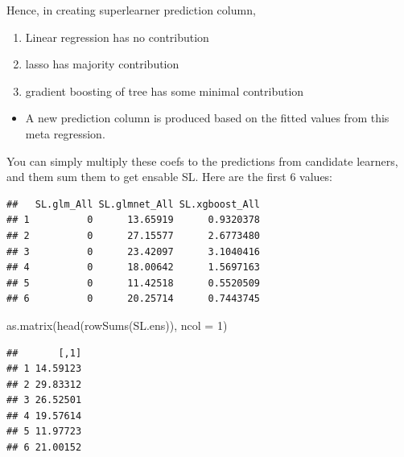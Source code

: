 \documentclass[
]{book}
\newenvironment{Shaded}{\begin{snugshade}}{\end{snugshade}}
\newcommand{\AttributeTok}[1]{\textcolor[rgb]{0.77,0.63,0.00}{#1}}
\newcommand{\DecValTok}[1]{\textcolor[rgb]{0.00,0.00,0.81}{#1}}
\newcommand{\FunctionTok}[1]{\textcolor[rgb]{0.00,0.00,0.00}{#1}}
\newcommand{\NormalTok}[1]{#1}
\newcommand{\OtherTok}[1]{\textcolor[rgb]{0.56,0.35,0.01}{#1}}
\newcommand{\SpecialCharTok}[1]{\textcolor[rgb]{0.00,0.00,0.00}{#1}}
\providecommand{\tightlist}{%
  \setlength{\itemsep}{0pt}\setlength{\parskip}{0pt}}
\begin{document}
Hence, in creating superlearner prediction column,

\begin{enumerate}
\def\labelenumi{\alph{enumi}.}
\tightlist
\item
  Linear regression has no contribution
\item
  lasso has majority contribution
\item
  gradient boosting of tree has some minimal contribution
\end{enumerate}

\begin{itemize}
\tightlist
\item
  A new prediction column is produced based on the fitted values from this meta regression.
\end{itemize}

You can simply multiply these coefs to the predictions from candidate learners, and them sum them to get ensable SL. Here are the first 6 values:

\begin{Shaded}
\end{Shaded}

\begin{verbatim}
##   SL.glm_All SL.glmnet_All SL.xgboost_All
## 1          0      13.65919      0.9320378
## 2          0      27.15577      2.6773480
## 3          0      23.42097      3.1040416
## 4          0      18.00642      1.5697163
## 5          0      11.42518      0.5520509
## 6          0      20.25714      0.7443745
\end{verbatim}

\begin{Shaded}
\begin{Highlighting}[]
\FunctionTok{as.matrix}\NormalTok{(}\FunctionTok{head}\NormalTok{(}\FunctionTok{rowSums}\NormalTok{(SL.ens)), }\AttributeTok{ncol =} \DecValTok{1}\NormalTok{)}
\end{Highlighting}
\end{Shaded}

\begin{verbatim}
##       [,1]
## 1 14.59123
## 2 29.83312
## 3 26.52501
## 4 19.57614
## 5 11.97723
## 6 21.00152
\end{verbatim}
\end{document}
